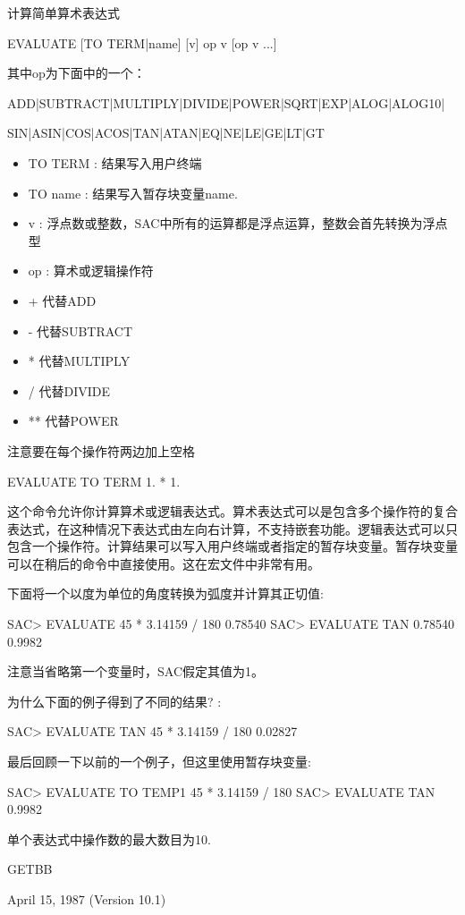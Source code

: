 \label{cmd:evaluate}

计算简单算术表达式

EVALUATE [TO TERM|name] [v] op v [op v ...]

其中op为下面中的一个：

ADD|SUBTRACT|MULTIPLY|DIVIDE|POWER|SQRT|EXP|ALOG|ALOG10|

SIN|ASIN|COS|ACOS|TAN|ATAN|EQ|NE|LE|GE|LT|GT

\begin{itemize}
\item TO TERM : 结果写入用户终端
\item TO name : 结果写入暂存块变量name.
\item v : 浮点数或整数，SAC中所有的运算都是浮点运算，整数会首先转换为浮点型
\item op : 算术或逻辑操作符
\end{itemize}

\begin{itemize}
\item + 代替ADD
\item - 代替SUBTRACT
\item * 代替MULTIPLY
\item / 代替DIVIDE
\item ** 代替POWER
\end{itemize}
注意要在每个操作符两边加上空格


EVALUATE TO TERM 1. * 1.

这个命令允许你计算算术或逻辑表达式。算术表达式可以是包含多个操作符的复合表达式，在这种情况下表达式由左向右计算，不支持嵌套功能。逻辑表达式可以只包含一个操作符。计算结果可以写入用户终端或者指定的暂存块变量。暂存块变量可以在稍后的命令中直接使用。这在宏文件中非常有用。

下面将一个以度为单位的角度转换为弧度并计算其正切值:
\begin{SACCode}
SAC> EVALUATE 45 * 3.14159 / 180
 0.78540
SAC> EVALUATE TAN 0.78540
 0.9982
\end{SACCode}
注意当省略第一个变量时，SAC假定其值为1。

为什么下面的例子得到了不同的结果? :
\begin{SACCode}
SAC> EVALUATE TAN 45 * 3.14159 / 180
 0.02827
\end{SACCode}
最后回顾一下以前的一个例子，但这里使用暂存块变量:
\begin{SACCode}
SAC> EVALUATE TO TEMP1 45 * 3.14159 / 180
SAC> EVALUATE TAN %
 0.9982
\end{SACCode}

单个表达式中操作数的最大数目为10.

GETBB

April 15, 1987 (Version 10.1)
